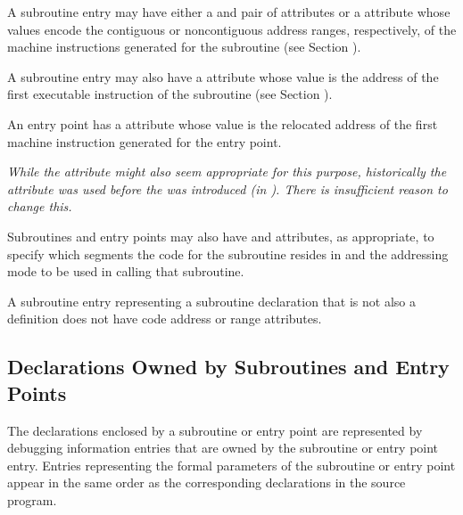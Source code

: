 A subroutine entry may have either a \DWATlowpc{} and
\DWAThighpc{} pair of attributes or a \DWATranges{} attribute
whose 
values 
encode the contiguous or non\dash contiguous address
ranges, respectively, of the machine instructions generated
for the subroutine (see 
Section ).

A 
\hypertarget{chap:DWATentrypcentryaddressofsubprogram}{}
subroutine entry may also have 
a 
\DWATentrypc{} attribute
whose value is the address of the first executable instruction
of the subroutine (see 
Section ).

An entry point has a \DWATlowpc{} attribute whose value is the
relocated address of the first machine instruction generated
for the entry point.

\textit{While the 
\DWATentrypc{} attribute 
might 
also seem appropriate
for this purpose, historically the 
\DWATlowpc{} attribute
was used before the 
\DWATentrypc{} was introduced (in
). 
There is insufficient reason to change this.}


Subroutines 
and 
entry
points 
\hypertarget{chap:DWATaddressclasssubroutineorsubroutinetype}{}
may also have 
\DWATsegment{} 
and
\DWATaddressclass{} attributes,
as appropriate, to specify
which segments the code for the subroutine resides in and
the addressing mode to be used in calling that subroutine.

A subroutine entry representing a subroutine declaration
that is not also a definition does not have code address or
range attributes.


\subsection{Declarations Owned by Subroutines and Entry Points} 
\label{chap:declarationsownedbysubroutinesandentrypoints}
The declarations enclosed by a subroutine or entry point are
represented by debugging information entries that are owned
by the subroutine or entry point entry. Entries representing
the formal parameters of the subroutine or entry point appear
in the same order as the corresponding declarations in the
source program.

